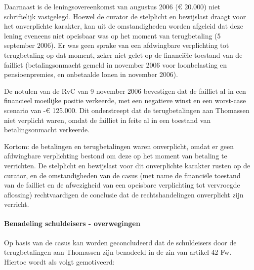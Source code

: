 \documentclass[
  dutch,
  a4paper,
]{article}
\begin{document}
Daarnaast is de leningsovereenkomst van augustus 2006 (€ 20.000) niet schriftelijk vastgelegd. Hoewel de curator de stelplicht en bewijslast draagt voor het onverplichte karakter, kan uit de omstandigheden worden afgeleid dat deze lening eveneens niet opeisbaar was op het moment van terugbetaling (5 september 2006). Er was geen sprake van een afdwingbare verplichting tot terugbetaling op dat moment, zeker niet gelet op de financiële toestand van de failliet (betalingsonmacht gemeld in november 2006 voor loonbelasting en pensioenpremies, en onbetaalde lonen in november 2006).

De notulen van de RvC van 9 november 2006 bevestigen dat de failliet al in een financieel moeilijke positie verkeerde, met een negatieve winst en een worst-case scenario van -€ 125.000. Dit onderstreept dat de terugbetalingen aan Thomassen niet verplicht waren, omdat de failliet in feite al in een toestand van betalingsonmacht verkeerde.

Kortom: de betalingen en terugbetalingen waren onverplicht, omdat er geen afdwingbare verplichting bestond om deze op het moment van betaling te verrichten. De stelplicht en bewijslast voor dit onverplichte karakter rusten op de curator, en de omstandigheden van de casus (met name de financiële toestand van de failliet en de afwezigheid van een opeisbare verplichting tot vervroegde aflossing) rechtvaardigen de conclusie dat de rechtshandelingen onverplicht zijn verricht.

\paragraph{Benadeling schuldeisers - overwegingen}\label{benadeling-schuldeisers---overwegingen-75}

Op basis van de casus kan worden geconcludeerd dat de schuldeisers door de terugbetalingen aan Thomassen zijn benadeeld in de zin van artikel 42 Fw. Hiertoe wordt als volgt gemotiveerd:
\end{document}
